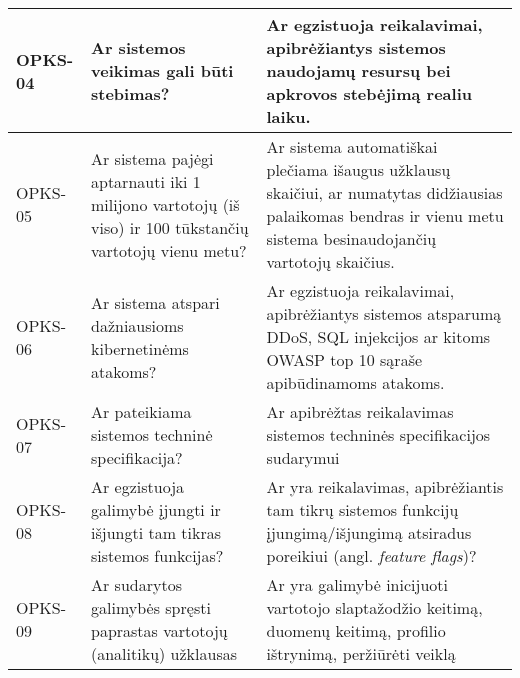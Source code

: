 \documentclass{VUMIFPSkursinis}
\begin{document}
\begin{center}
\begin{longtable}{|C{2cm}|L{5cm}|L{8cm}|}
		OPKS-04                                                                                                 &
		Ar sistemos veikimas gali būti stebimas?                                                                &
		Ar egzistuoja reikalavimai, apibrėžiantys sistemos naudojamų resursų bei apkrovos stebėjimą realiu laiku.                                                                                     \\ \hline
		OPKS-05                                                                                                 &
		Ar sistema pajėgi aptarnauti iki 1 milijono vartotojų (iš viso) ir 100 tūkstančių vartotojų vienu metu? &
		Ar sistema automatiškai plečiama išaugus užklausų skaičiui, ar numatytas didžiausias palaikomas bendras ir vienu metu sistema besinaudojančių vartotojų skaičius.                             \\ \hline
		OPKS-06                                                                                                 &
		Ar sistema atspari dažniausioms kibernetinėms atakoms?                                                  &
		Ar egzistuoja reikalavimai, apibrėžiantys sistemos atsparumą DDoS, SQL injekcijos ar kitoms OWASP top 10 sąraše apibūdinamoms atakoms.                                                        \\ \hline
		OPKS-07                                                                                                 &
		Ar pateikiama sistemos techninė specifikacija?                                                          &
		Ar apibrėžtas reikalavimas sistemos techninės specifikacijos sudarymui                                                                                                                        \\ \hline
		OPKS-08                                                                                                 &
		Ar egzistuoja galimybė įjungti ir išjungti tam tikras sistemos funkcijas?                               &
		Ar yra reikalavimas, apibrėžiantis tam tikrų sistemos funkcijų įjungimą/išjungimą atsiradus poreikiui (angl. \textit{feature flags})?                                                         \\ \hline
		OPKS-09                                                                                                 &
		Ar sudarytos galimybės spręsti paprastas vartotojų (analitikų) užklausas                                &
		Ar yra galimybė inicijuoti vartotojo slaptažodžio keitimą, duomenų keitimą, profilio ištrynimą, peržiūrėti veiklą                                                                             \\ \hline
	\end{longtable}
\end{center}
\end{document}
